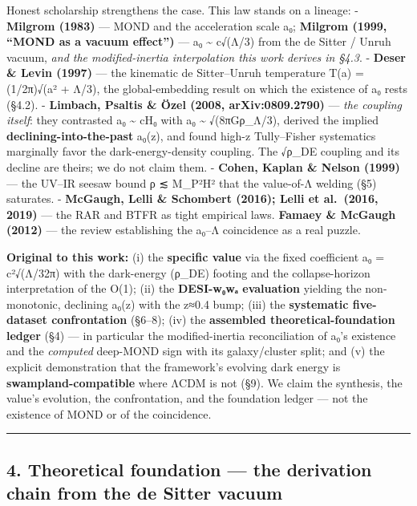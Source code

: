 \documentclass[
]{article}
\begin{document}
Honest scholarship strengthens the case. This law stands on a lineage: -
\textbf{Milgrom (1983)} --- MOND and the acceleration scale a₀;
\textbf{Milgrom (1999, ``MOND as a vacuum effect'')} --- a₀
\textasciitilde{} c√(Λ/3) from the de Sitter / Unruh vacuum, \emph{and
the modified-inertia interpolation this work derives in §4.3}. -
\textbf{Deser \& Levin (1997)} --- the kinematic de Sitter--Unruh
temperature T(a) = (1/2π)√(a² + Λ/3), the global-embedding result on
which the existence of a₀ rests (§4.2). - \textbf{Limbach, Psaltis \&
Özel (2008, arXiv:0809.2790)} --- \emph{the coupling itself}: they
contrasted a₀ \textasciitilde{} cH₀ with a₀ \textasciitilde{}
√(8πGρ\_Λ/3), derived the implied \textbf{declining-into-the-past}
a₀(z), and found high-z Tully--Fisher systematics marginally favor the
dark-energy-density coupling. The √ρ\_DE coupling and its decline are
theirs; we do not claim them. - \textbf{Cohen, Kaplan \& Nelson (1999)}
--- the UV--IR seesaw bound ρ ≲ M\_P²H² that the value-of-Λ welding (§5)
saturates. - \textbf{McGaugh, Lelli \& Schombert (2016); Lelli et
al.~(2016, 2019)} --- the RAR and BTFR as tight empirical laws.
\textbf{Famaey \& McGaugh (2012)} --- the review establishing the a₀--Λ
coincidence as a real puzzle.

\textbf{Original to this work:} (i) the \textbf{specific value} via the
fixed coefficient a₀ = c²√(Λ/32π) with the dark-energy (ρ\_DE) footing
and the collapse-horizon interpretation of the O(1); (ii) the
\textbf{DESI-w₀wₐ evaluation} yielding the non-monotonic, declining
a₀(z) with the z≈0.4 bump; (iii) the \textbf{systematic five-dataset
confrontation} (§6--8); (iv) the \textbf{assembled
theoretical-foundation ledger} (§4) --- in particular the
modified-inertia reconciliation of a₀'s existence and the
\emph{computed} deep-MOND sign with its galaxy/cluster split; and (v)
the explicit demonstration that the framework's evolving dark energy is
\textbf{swampland-compatible} where ΛCDM is not (§9). We claim the
synthesis, the value's evolution, the confrontation, and the foundation
ledger --- not the existence of MOND or of the coincidence.

\begin{center}\rule{0.5\linewidth}{0.5pt}\end{center}

\subsection{4. Theoretical foundation --- the derivation chain from the
de Sitter
vacuum}\label{theoretical-foundation-the-derivation-chain-from-the-de-sitter-vacuum}
\end{document}
